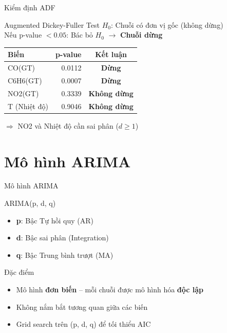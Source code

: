\documentclass[serif, aspectratio=169]{beamer}
\newcommand{\highlight}[1]{\textbf{\color{hkustblue}#1}}
\newcommand{\red}[1]{\textbf{\color{hkustred}#1}}
\newcommand{\green}[1]{\textbf{\color{codegreen}#1}}
\begin{document}
\begin{frame}{Kiểm định ADF}
    \begin{block}{Augmented Dickey-Fuller Test}
        $H_0$: Chuỗi có đơn vị gốc (không dừng) \\
        Nếu p-value $< 0.05$: Bác bỏ $H_0$ $\rightarrow$ \green{Chuỗi dừng}
    \end{block}

    \vspace{0.5cm}
    \begin{center}
        \begin{tabular}{|l|r|c|}
            \hline
            \textbf{Biến} & \textbf{p-value} & \textbf{Kết luận} \\ \hline
            CO(GT) & 0.0112 & \green{Dừng} \\ \hline
            C6H6(GT) & 0.0007 & \green{Dừng} \\ \hline
            NO2(GT) & 0.3339 & \red{Không dừng} \\ \hline
            T (Nhiệt độ) & 0.9046 & \red{Không dừng} \\ \hline
        \end{tabular}
    \end{center}

    \vspace{0.3cm}
    $\Rightarrow$ NO2 và Nhiệt độ cần sai phân ($d \geq 1$)
\end{frame}

\section{Mô hình ARIMA}

\begin{frame}{Mô hình ARIMA}
    \begin{block}{ARIMA(p, d, q)}
        \begin{itemize}
            \item \highlight{p}: Bậc Tự hồi quy (AR)
            \item \highlight{d}: Bậc sai phân (Integration)
            \item \highlight{q}: Bậc Trung bình trượt (MA)
        \end{itemize}
    \end{block}

    \vspace{0.4cm}
    \begin{alertblock}{Đặc điểm}
        \begin{itemize}
            \item Mô hình \highlight{đơn biến} -- mỗi chuỗi được mô hình hóa \highlight{độc lập}
            \item Không nắm bắt tương quan giữa các biến
            \item Grid search trên (p, d, q) để tối thiểu AIC
        \end{itemize}
    \end{alertblock}
\end{frame}
\end{document}
